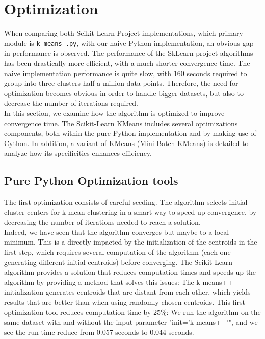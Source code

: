 \documentclass[11pt]{article}
\begin{document}
\section*{Optimization}
When comparing both Scikit-Learn Project implementations, which primary module is \verb|k_means_.py|, with our naive Python implementation, an obvious gap in performance is observed. The performance of the SkLearn project algorithms has been drastically more efficient, with a much shorter convergence time.  The naive implementation performance is quite slow, with 160 seconds required to group into three clusters half a million data points. Therefore, the need for optimization becomes obvious in order to handle bigger datasets, but also to decrease the number of iterations required. \\

\noindent In this section, we examine how the algorithm is optimized to improve convergence time. The Scikit-Learn KMeans includes several optimizations components, both within the pure Python implementation and by making use of Cython. In addition, a variant of KMeans (Mini Batch KMeans) is detailed to analyze how its specificities enhances efficiency.  

\subsection*{Pure Python Optimization tools}
The first optimization consists of careful seeding. The algorithm selects initial cluster centers for k-mean clustering in a smart way to speed up convergence, by decreasing the number of iterations needed to reach a solution. \\

\noindent Indeed, we have seen that the algorithm converges but maybe to a local minimum. This is a directly impacted by the initialization of the centroids in the first step, which requires several computation of the algorithm (each one generating different initial centroids) before converging. The Scikit Learn algorithm provides a solution that reduces computation times and speeds up the algorithm by providing a method that solves this issues: The k-means++ initialization generates centroids that are distant from each other, which yields results that are better than when using randomly chosen centroids. This first optimization tool reduces computation time by 25\%: We run the algorithm on the same dataset with and without the input parameter "init='k-means++'", and we see the run time reduce from 0.057 seconds to 0.044 seconds. \\
\end{document}
